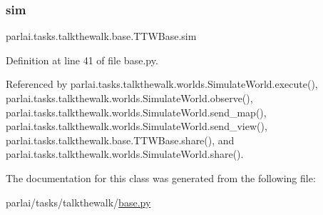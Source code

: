 \mbox{\label{classparlai_1_1tasks_1_1talkthewalk_1_1base_1_1TTWBase_a723ca7277cb3040cbfef0d9ef3161df3}} 
\subsubsection{\texorpdfstring{sim}{sim}}
{\footnotesize\ttfamily parlai.\+tasks.\+talkthewalk.\+base.\+T\+T\+W\+Base.\+sim}



Definition at line 41 of file base.\+py.



Referenced by parlai.\+tasks.\+talkthewalk.\+worlds.\+Simulate\+World.\+execute(), parlai.\+tasks.\+talkthewalk.\+worlds.\+Simulate\+World.\+observe(), parlai.\+tasks.\+talkthewalk.\+worlds.\+Simulate\+World.\+send\+\_\+map(), parlai.\+tasks.\+talkthewalk.\+worlds.\+Simulate\+World.\+send\+\_\+view(), parlai.\+tasks.\+talkthewalk.\+base.\+T\+T\+W\+Base.\+share(), and parlai.\+tasks.\+talkthewalk.\+worlds.\+Simulate\+World.\+share().



The documentation for this class was generated from the following file\+:\begin{DoxyCompactItemize}
\item 
parlai/tasks/talkthewalk/\hyperlink{base_8py}{base.\+py}\end{DoxyCompactItemize}
